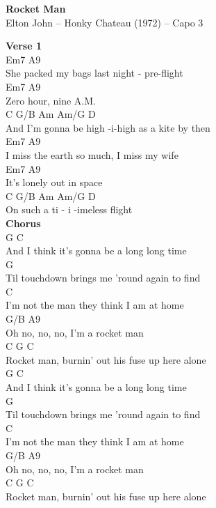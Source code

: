 \documentclass[a4paper]{article}
\begin{document}
    \begin{center}
        \textbf{Rocket Man}
        ~\\
        Elton John -- Honky Chateau (1972)
         -- Capo 3
    \end{center}
    {
        \scriptsize
        \textbf{Verse 1}
        ~\\
        {
            \cutive
            \obeyspaces
Em7                                     A9
\\
   She packed my bags last night - pre-flight
\\
Em7                A9
\\
   Zero hour, nine A.M.
\\
C                  G/B     Am    Am/G              D
\\
  And I'm gonna be high -i-high       as a kite by then
\\
Em7                            A9
\\
   I miss the earth so much, I miss my wife
\\
Em7                   A9
\\
   It's lonely out in space
\\
C           G/B     Am             Am/G    D
\\
  On such a ti - i -imeless flight
\\

        }
        \textbf{Chorus}
        ~\\
        {
            \cutive
            \obeyspaces
G                                      C
\\
 And I think it's gonna be a long long time
\\
                                        G
\\
Til touchdown brings me 'round again to find
\\
                                   C
\\
I'm not the man they think I am at home
\\
           G/B        A9
\\
Oh no, no, no, I'm a rocket man
\\
C                                   G           C
\\
Rocket man, burnin' out his fuse up here alone
\\
G                                      C
\\
 And I think it's gonna be a long long time
\\
                                        G
\\
Til touchdown brings me 'round again to find
\\
                                   C
\\
I'm not the man they think I am at home
\\
           G/B       A9
\\
Oh no, no, no, I'm a rocket man
\\
C                                   G           C
\\
Rocket man, burnin' out his fuse up here alone
\\

}}
\end{document}
